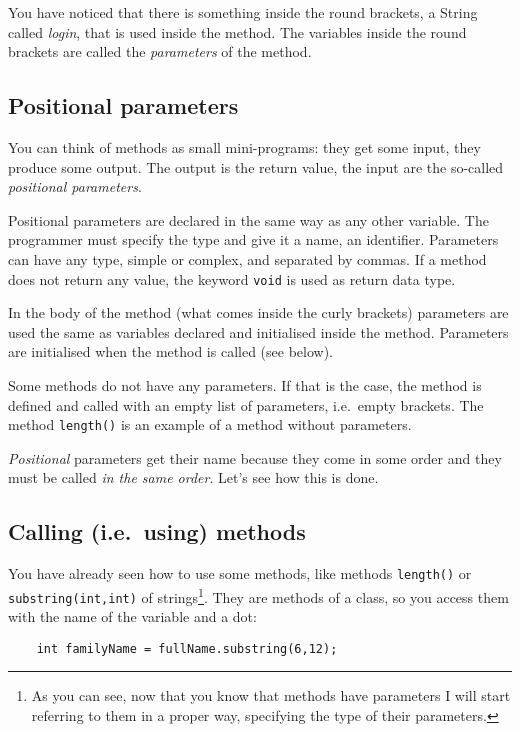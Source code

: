 You have noticed that there is something inside the round brackets, a
String called \emph{login}, that is used inside the method. The
variables inside the round brackets are called the \emph{parameters} of the
method. 

\subsection{Positional parameters}
\label{sec:pospar}

You can think of methods as small mini-programs: they get some input,
they produce some output. The output is the return value, the input
are the so-called \emph{positional parameters}. 

Positional parameters are declared in the same way as any other
variable. The programmer must specify the type and give it a name, an
identifier. Parameters can have any type, simple or complex, and
separated by commas. If a method does not return any value, the
keyword \verb+void+ is used as return data type. 

In the body of the method (what comes inside the curly
brackets) parameters are used the same as variables declared and
initialised inside the method. Parameters are initialised when the
method is called (see below). 

Some methods do not have any parameters. If that is the case, the
method is defined and called with an empty list of parameters,
i.e.~empty brackets. The method \verb+length()+ is an example of a
method without parameters. 

\emph{Positional} parameters get their name because they come in some
order and they must be called \emph{in the same order}. Let's see how
this is done. 

\subsection{Calling (i.e.~using) methods}
\label{sec:using}

You have already seen how to use some methods, like methods
\verb+length()+ or \verb+substring(int,int)+ of strings\footnote{As
  you can see, now that you know that methods have parameters I will
  start referring to them in a proper way, specifying the type of
  their parameters.}. They are methods of a
class, so you access them with the name of the variable and a dot: 

\begin{verbatim}
    int familyName = fullName.substring(6,12);
\end{verbatim}


